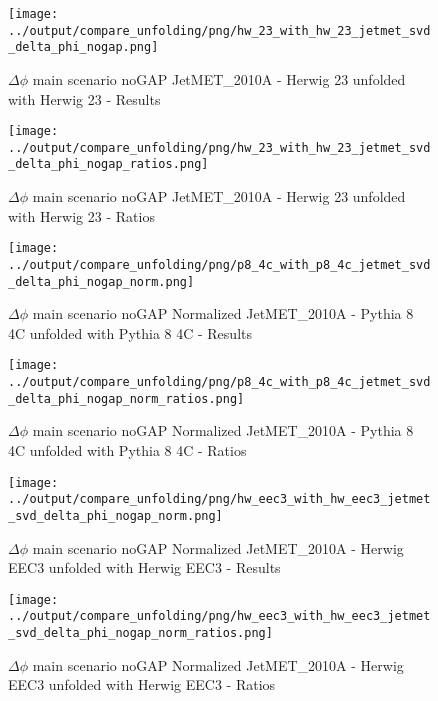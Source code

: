 \documentclass[11pt]{book}
\begin{document}
\begin{figure}[ht]
\centering
\texttt{[image: ../output/compare\_unfolding/png/hw\_23\_with\_hw\_23\_jetmet\_svd\_delta\_phi\_nogap.png]}
\caption{$\Delta\phi$ main scenario noGAP JetMET\_2010A - Herwig 23 unfolded with Herwig 23 - Results}
\label{hw_23_hw_23_jetmet_svd_delta_phi_nogap_a}
\end{figure}

\begin{figure}[ht]
\centering
\texttt{[image: ../output/compare\_unfolding/png/hw\_23\_with\_hw\_23\_jetmet\_svd\_delta\_phi\_nogap\_ratios.png]}
\caption{$\Delta\phi$ main scenario noGAP JetMET\_2010A - Herwig 23 unfolded with Herwig 23 - Ratios}
\label{hw_23_hw_23_jetmet_svd_delta_phi_nogap_b}
\end{figure}


\begin{figure}[ht]
\centering
\texttt{[image: ../output/compare\_unfolding/png/p8\_4c\_with\_p8\_4c\_jetmet\_svd\_delta\_phi\_nogap\_norm.png]}
\caption{$\Delta\phi$ main scenario noGAP Normalized JetMET\_2010A - Pythia 8 4C unfolded with Pythia 8 4C - Results}
\label{p8_p8_jetmet_svd_delta_phi_nogap_norm_a}
\end{figure}

\begin{figure}[ht]
\centering
\texttt{[image: ../output/compare\_unfolding/png/p8\_4c\_with\_p8\_4c\_jetmet\_svd\_delta\_phi\_nogap\_norm\_ratios.png]}
\caption{$\Delta\phi$ main scenario noGAP Normalized JetMET\_2010A - Pythia 8 4C unfolded with Pythia 8 4C - Ratios}
\label{p8_p8_jetmet_svd_delta_phi_nogap_norm_b}
\end{figure}

\begin{figure}[ht]
\centering
\texttt{[image: ../output/compare\_unfolding/png/hw\_eec3\_with\_hw\_eec3\_jetmet\_svd\_delta\_phi\_nogap\_norm.png]}
\caption{$\Delta\phi$ main scenario noGAP Normalized JetMET\_2010A - Herwig EEC3 unfolded with Herwig EEC3 - Results}
\label{hw_eec3_hw_eec3_jetmet_svd_delta_phi_nogap_norm_a}
\end{figure}

\begin{figure}[ht]
\centering
\texttt{[image: ../output/compare\_unfolding/png/hw\_eec3\_with\_hw\_eec3\_jetmet\_svd\_delta\_phi\_nogap\_norm\_ratios.png]}
\caption{$\Delta\phi$ main scenario noGAP Normalized JetMET\_2010A - Herwig EEC3 unfolded with Herwig EEC3 - Ratios}
\label{hw_eec3_hw_eec3_jetmet_svd_delta_phi_nogap_norm_b}
\end{figure}
\end{document}
